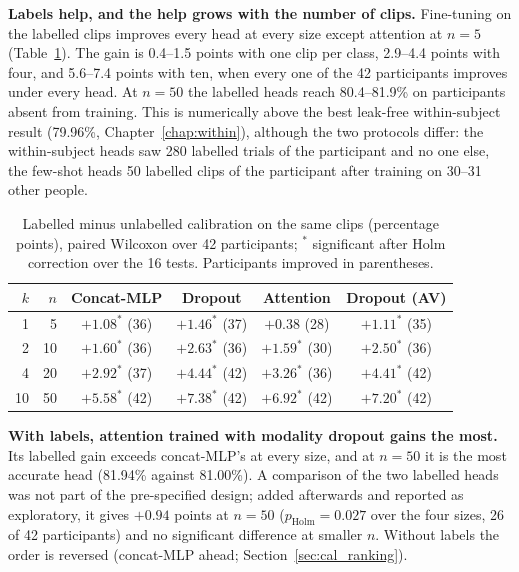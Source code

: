 \textbf{Labels help, and the help grows with the number of clips.} Fine-tuning on the
labelled clips improves every head at every size except attention at $n = 5$
(Table~\ref{tab:cal_labelled_tests}). The gain is 0.4--1.5 points with one clip per
class, 2.9--4.4 points with four, and 5.6--7.4 points with ten, when every one of the 42
participants improves under every head. At $n = 50$ the labelled heads reach
80.4--81.9\% on participants absent from training. This is numerically above the best
leak-free within-subject result (79.96\%, Chapter~\ref{chap:within}), although the two
protocols differ: the within-subject heads saw 280 labelled trials of the participant
and no one else, the few-shot heads 50 labelled clips of the participant after training
on 30--31 other people.

\begin{table}[htbp]
\centering
\small
\caption{Labelled minus unlabelled calibration on the same clips (percentage points),
paired Wilcoxon over 42 participants; $^{*}$ significant after Holm correction over the
16 tests. Participants improved in parentheses.}
\label{tab:cal_labelled_tests}
\begin{tabular}{rrcccc}
\hline
\textbf{$k$} & \textbf{$n$} & \textbf{Concat-MLP} & \textbf{Dropout} & \textbf{Attention} & \textbf{Dropout (AV)} \\
\hline
1  & 5  & $+1.08^{*}$ (36) & $+1.46^{*}$ (37) & $+0.38$ (28)     & $+1.11^{*}$ (35) \\
2  & 10 & $+1.60^{*}$ (36) & $+2.63^{*}$ (36) & $+1.59^{*}$ (30) & $+2.50^{*}$ (36) \\
4  & 20 & $+2.92^{*}$ (37) & $+4.44^{*}$ (42) & $+3.26^{*}$ (36) & $+4.41^{*}$ (42) \\
10 & 50 & $+5.58^{*}$ (42) & $+7.38^{*}$ (42) & $+6.92^{*}$ (42) & $+7.20^{*}$ (42) \\
\hline
\end{tabular}
\end{table}

\textbf{With labels, attention trained with modality dropout gains the most.} Its
labelled gain exceeds concat-MLP's at every size, and at $n = 50$ it is the most
accurate head (81.94\% against 81.00\%). A comparison of the two labelled heads was not
part of the pre-specified design; added afterwards and reported as exploratory, it gives
$+0.94$ points at $n = 50$ ($p_{\mathrm{Holm}} = 0.027$ over the four sizes, 26 of 42
participants) and no significant difference at smaller $n$. Without labels the order is
reversed (concat-MLP ahead; Section~\ref{sec:cal_ranking}).

